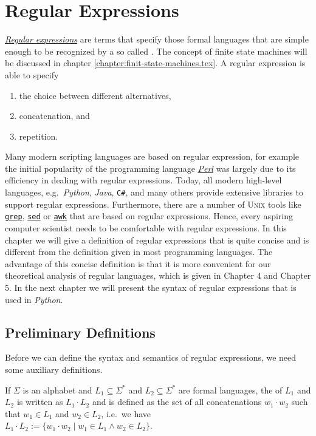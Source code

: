 \chapter{Regular Expressions \label{chapter:regular-expressions}}
\href{http://en.wikipedia.org/wiki/Regular_expression}{\emph{Regular expressions}} are terms that
specify those formal languages that are simple enough to be recognized by a so called .
The concept of finite state machines will be discussed in chapter \ref{chapter:finit-state-machines.tex}.
A regular expression is able to specify 
\begin{enumerate}
\item the choice between different alternatives,
\item concatenation, and
\item repetition.
\end{enumerate}
Many modern scripting languages are based on regular expression, for example
the initial popularity of the programming language \href{http://en.wikipedia.org/wiki/Perl}{\textsl{Perl}} was
largely due to its efficiency in dealing with regular expressions.
Today, all modern high-level languages, e.g.~\textsl{Python}, \textsl{Java}, \texttt{C\#}, and many others
provide extensive libraries to support regular expressions.  Furthermore, there are a number of 
\textsc{Unix} tools like \href{http://en.wikipedia.org/wiki/Grep}{\texttt{grep}}, 
\href{http://en.wikipedia.org/wiki/Sed}{\texttt{sed}} or
\href{http://en.wikipedia.org/wiki/Awk}{\texttt{awk}} that are based on regular expressions.  Hence,
every aspiring computer scientist needs to be comfortable with regular expressions.  In this chapter
we will give a definition of regular expressions that is quite concise and is different from the definition
given in most programming languages.  The advantage of this concise definition is that it is more convenient
for our theoretical analysis of regular languages, which is given in Chapter 4 and Chapter 5.  In the next chapter
we will present the syntax of regular expressions that is used in \textsl{Python}.

\section{Preliminary Definitions}
Before we can define the syntax and semantics of regular expressions, we need some auxiliary definitions. 

\begin{Definition}
  If $\Sigma$ is an  alphabet and $L_1 \subseteq \Sigma^*$ and $L_2 \subseteq \Sigma^*$ are formal
  languages, the   of $L_1$ and $L_2$ is written as
  $L_1 \cdot L_2$  and is defined as the set of all concatenations $w_1 \cdot w_2$ such that $w_1 \in L_1$ and
  $w_2 \in L_2$, i.e.~we have
  \\[0.2cm]
  \hspace*{1.3cm}
  $L_1 \cdot L_2 := \bigl\{ w_1 \cdot w_2 \mid w_1 \in L_1 \wedge w_2 \in L_2 \bigr\}$. \eox
\end{Definition}

